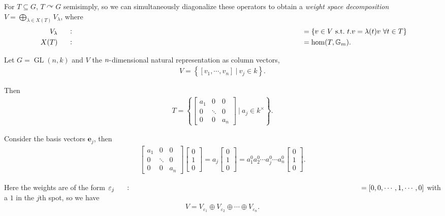 For \(T\subseteq G\), \(T\curvearrowright G\) semisimply, so we can
simultaneously diagonalize these operators to obtain a \emph{weight
space decomposition} \(V = \bigoplus_{\lambda \in X(T)} V_\lambda\),
where
\begin{align*}   V_\lambda &\mathrel{\vcenter{:}}=\left\{{v\in V~{\text{s.t.}}~t.v = \lambda(t)v\,\, \forall t\in T}\right\} \\\ X(T) &\mathrel{\vcenter{:}}=\hom(T, {\mathbb{G}}_m) .\end{align*}

\begin{example}

\begin{example}

Let \(G = \operatorname{GL}(n, k)\) and \(V\) the
\(n{\hbox{-}}\)dimensional natural representation as column vectors,
\begin{align*}   V = \left\{{{\left[ {v_1, \cdots, v_n} \right]} {~\mathrel{\Big|}~}v_j \in k}\right\} .\end{align*}

Then
\begin{align*}   T = \left\{{ \begin{bmatrix} a_1 & 0 & 0 \\ 0 & \ddots & 0\\ 0 & 0 & a_n \end{bmatrix} {~\mathrel{\Big|}~}a_j \in k^{\times} }\right\} .\end{align*}

Consider the basis vectors \(\mathbf{e}_j\), then
\begin{align*}   \begin{bmatrix} a_1 & 0 & 0 \\ 0 & \ddots & 0\\ 0 & 0 & a_n \end{bmatrix}  \begin{bmatrix} 0  \\ 1  \\ 0 \end{bmatrix} = a_j \begin{bmatrix} 0  \\ 1 \\ 0 \end{bmatrix} = a_1^0 a_2^0 \cdots a_j^0 \cdots a_n^0 \begin{bmatrix} 0  \\ 1 \\ 0 \end{bmatrix} .\end{align*}

Here the weights are of the form
\(\varepsilon_j\mathrel{\vcenter{:}}={\left[ {0, 0, \cdots, 1, \cdots, 0} \right]}\)
with a \(1\) in the \(j\)th spot, so we have
\begin{align*}   V = V_{\varepsilon_1} \oplus V_{\varepsilon_2} \oplus \cdots \oplus V_{{\varepsilon_n}} .\end{align*}

\end{example}

\end{example}

